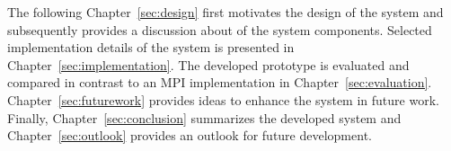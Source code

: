 The following Chapter~\ref{sec:design} first motivates the design of
the system and subsequently provides a discussion about of the system
components.  Selected implementation details of the system is
presented in Chapter~\ref{sec:implementation}. The developed prototype
is evaluated and compared in contrast to an MPI implementation in
Chapter~\ref{sec:evaluation}. Chapter~\ref{sec:futurework} provides
ideas to enhance the system in future work. Finally,
Chapter~\ref{sec:conclusion} summarizes the developed system and
Chapter~\ref{sec:outlook} provides an outlook for future development.


\cleardoublepage

